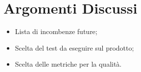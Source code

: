 \section{Argomenti Discussi}
	\begin{itemize}
		\item Lista di incombenze future;
		\item Scelta del test da eseguire sul prodotto;
		\item Scelta delle metriche per la qualità.
	\end{itemize}